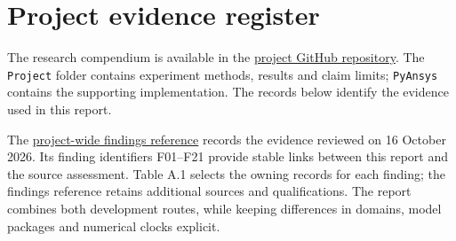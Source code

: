 \section{Project evidence register}

The research compendium is available in the \href{https://github.com/Shuhei-uni/P4P_knowledgeWiki}{project GitHub repository}. The \texttt{Project} folder contains experiment methods, results and claim limits; \texttt{PyAnsys} contains the supporting implementation. The records below identify the evidence used in this report.

The \href{https://github.com/Shuhei-uni/P4P_knowledgeWiki/blob/main/Project/Final\%20research\%20report/AndyReport/review/project-findings-and-report-claims.md}{project-wide findings reference} records the evidence reviewed on 16 October 2026. Its finding identifiers F01--F21 provide stable links between this report and the source assessment. Table A.1 selects the owning records for each finding; the findings reference retains additional sources and qualifications. The report combines both development routes, while keeping differences in domains, model packages and numerical clocks explicit.

